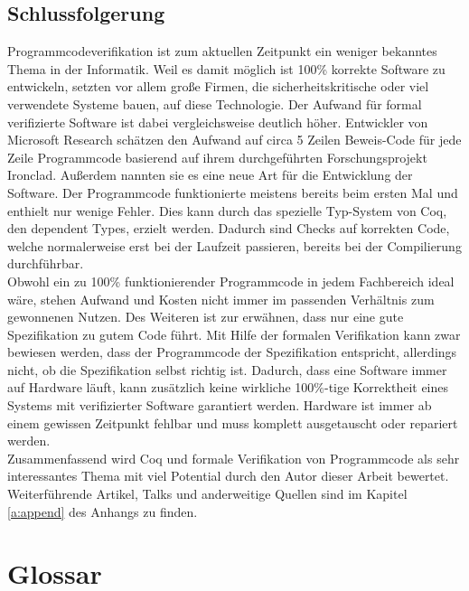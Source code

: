 \subsection{Schlussfolgerung}

Programmcodeverifikation ist zum aktuellen Zeitpunkt ein weniger bekanntes Thema in der Informatik. Weil es damit möglich ist 100\% korrekte Software zu entwickeln, setzten vor allem große Firmen, die sicherheitskritische oder viel verwendete Systeme bauen, auf diese Technologie. Der Aufwand für formal verifizierte Software ist dabei vergleichsweise deutlich höher. Entwickler von Microsoft Research schätzen den Aufwand auf circa 5 Zeilen Beweis-Code für jede Zeile Programmcode basierend auf ihrem durchgeführten Forschungsprojekt Ironclad. Außerdem nannten sie es eine neue Art für die Entwicklung der Software. Der Programmcode funktionierte meistens bereits beim ersten Mal und enthielt nur wenige Fehler. Dies kann durch das spezielle Typ-System von Coq, den dependent Types, erzielt werden. Dadurch sind Checks auf korrekten Code, welche normalerweise erst bei der Laufzeit passieren, bereits bei der Compilierung durchführbar.\\
Obwohl ein zu 100\% funktionierender Programmcode in jedem Fachbereich ideal wäre, stehen Aufwand und Kosten nicht immer im passenden Verhältnis zum gewonnenen Nutzen.
Des Weiteren ist zur erwähnen, dass nur eine gute Spezifikation zu gutem Code führt. Mit Hilfe der formalen Verifikation kann zwar bewiesen werden, dass der Programmcode der Spezifikation entspricht, allerdings nicht, ob die Spezifikation selbst richtig ist.
Dadurch, dass eine Software immer auf Hardware läuft, kann zusätzlich keine wirkliche 100\%-tige Korrektheit eines Systems mit verifizierter Software garantiert werden. Hardware ist immer ab einem gewissen Zeitpunkt fehlbar und muss komplett ausgetauscht oder repariert werden.\\
Zusammenfassend wird Coq und formale Verifikation von Programmcode als sehr interessantes Thema mit viel Potential durch den Autor dieser Arbeit bewertet. Weiterführende Artikel, Talks und anderweitige Quellen sind im Kapitel \ref{a:append} des Anhangs zu finden. 

\section{Glossar}


